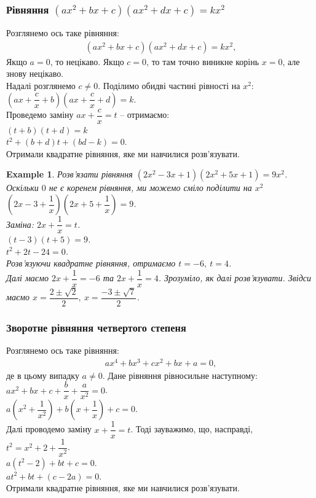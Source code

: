 \documentclass[a4paper, 10pt]{article}
\theoremstyle{theoremdd}
\theoremstyle{theoremdd}
\theoremstyle{theoremdd}
\theoremstyle{theoremdd}
\newtheorem{example}[theorem]{Example}
\theoremstyle{theoremdd}
\theoremstyle{theoremdd}
\theoremstyle{theoremdd}
\theoremstyle{theoremdd}
\begin{document}
\subsubsection{Рівняння $(ax^2+bx+c)(ax^2+dx+c) =kx^2$}
Розглянемо ось таке рівняння:
\begin{align*}
(ax^2+bx+c)(ax^2+dx+c) = kx^2,
\end{align*}
Якщо $a = 0$, то нецікаво. Якщо $c = 0$, то там точно виникне корінь $x = 0$, але знову нецікаво.\\
Надалі розглянемо $c \neq 0$. Поділимо обидві частині рівності на $x^2$:\\
$\left(ax + \dfrac{c}{x} + b\right)\left(ax + \dfrac{c}{x}+d\right) = k$.\\
Проведемо заміну $ax + \dfrac{c}{x} = t$ -- отримаємо:\\
$(t+b)(t+d) = k$\\
$t^2 + (b+d)t + (bd - k) = 0$.\\
Отримали квадратне рівняння, яке ми навчилися розв'язувати.

\begin{example}
Розв'язати рівняння $(2x^2-3x+1)(2x^2+5x+1) = 9x^2$.\\
Оскільки $0$ не є коренем рівняння, ми можемо сміло поділити на $x^2$\\
$\left( 2x - 3 + \dfrac{1}{x} \right) \left( 2x + 5 + \dfrac{1}{x} \right) = 9$.\\
Заміна: $2x+\dfrac{1}{x} = t$.\\
$(t-3)(t+5) = 9$.\\
$t^2 +2t -24 = 0$.\\
Розв'язуючи квадратне рівняння, отримаємо $t = -6,\ t = 4$.\\
Далі маємо $2x+\dfrac{1}{x} = -6$ та $2x + \dfrac{1}{x} = 4$. Зрозуміло, як далі розв'язувати. Звідси маємо $x = \dfrac{2 \pm \sqrt{2}}{2},\ x = \dfrac{-3\pm \sqrt{7}}{2}$.
\end{example}

\subsubsection{Зворотне рівняння четвертого степеня}
Розглянемо ось таке рівняння:
\begin{align*}
ax^4 + bx^3 + cx^2 + bx + a = 0,
\end{align*}
де в цьому випадку $a \neq 0$. Дане рівняння рівносильне наступному:
$ax^2 + bx + c + \dfrac{b}{x} + \dfrac{a}{x^2} = 0$.\\
$a\left( x^2 + \dfrac{1}{x^2} \right) + b\left( x + \dfrac{1}{x} \right) + c = 0$.\\
Далі проводемо заміну $x + \dfrac{1}{x} = t$. Тоді зауважимо, що, насправді, $t^2 = x^2 + 2 + \dfrac{1}{x^2}$.\\
$a(t^2-2) + bt + c = 0$.\\
$at^2 + bt + (c-2a) = 0$.\\
Отримали квадратне рівняння, яке ми навчилися розв'язувати.
\end{document}
